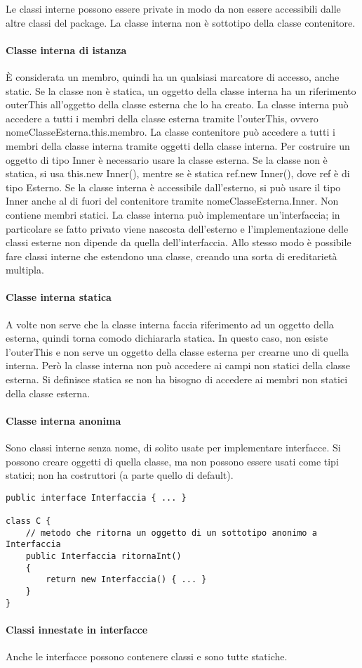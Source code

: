 Le classi interne possono essere private in modo da non essere accessibili dalle altre classi del package.
La classe interna non è sottotipo della classe contenitore.
\paragraph{Classe interna di istanza} È considerata un membro, quindi ha un qualsiasi marcatore di accesso, anche static. Se la classe non è statica, un oggetto della classe interna ha un riferimento outerThis all'oggetto della classe esterna che lo ha creato.
La classe interna può accedere a tutti i membri della classe esterna tramite l'outerThis, ovvero nomeClasseEsterna.this.membro.
La classe contenitore può accedere a tutti i membri della classe interna tramite oggetti della classe interna.
Per costruire un oggetto di tipo Inner è necessario usare la classe esterna. Se la classe non è statica, si usa this.new Inner(), mentre se è statica ref.new Inner(), dove ref è di tipo Esterno.
Se la classe interna è accessibile dall'esterno, si può usare il tipo Inner anche al di fuori del contenitore tramite nomeClasseEsterna.Inner. 
Non contiene membri statici.
La classe interna può implementare un'interfaccia; in particolare se fatto privato viene nascosta dell'esterno e l'implementazione delle classi esterne non dipende da quella dell'interfaccia. Allo stesso modo è possibile fare classi interne che estendono una classe, creando una sorta di ereditarietà multipla.
\paragraph{Classe interna statica}
A volte non serve che la classe interna faccia riferimento ad un oggetto della esterna, quindi torna comodo dichiararla statica. In questo caso, non esiste l'outerThis e non serve un oggetto della classe esterna per crearne uno di quella interna. Però la classe interna non può accedere ai campi non statici della classe esterna.
Si definisce statica se non ha bisogno di accedere ai membri non statici della classe esterna.
\paragraph{Classe interna anonima}
Sono classi interne senza nome, di solito usate per implementare interfacce. Si possono creare oggetti di quella classe, ma non possono essere usati come tipi statici; non ha costruttori (a parte quello di default).
\begin{lstlisting}
public interface Interfaccia { ... }

class C {
    // metodo che ritorna un oggetto di un sottotipo anonimo a Interfaccia
    public Interfaccia ritornaInt()
    {
        return new Interfaccia() { ... }
    }
}
\end{lstlisting} 
\paragraph{Classi innestate in interfacce}
Anche le interfacce possono contenere classi e sono tutte statiche.

